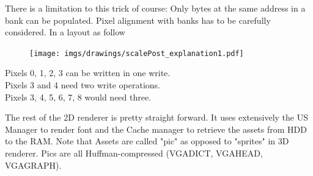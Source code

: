 \par



There is a limitation to this trick of course: Only bytes at the same address in a bank can be populated. Pixel alignment with banks has to be carefully considered. In a layout as follow\\
\par
\begin{figure}[H]
\centering
 \texttt{[image: imgs/drawings/scalePost\_explanation1.pdf]}
 \end{figure}
Pixels 0, 1, 2, 3 can be written in one write.\\
Pixels 3 and 4 need two write operations.\\
Pixels 3, 4, 5, 6, 7, 8 would need three.\\


\par
The rest of the 2D renderer is pretty straight forward. It uses extensively the US Manager to render font and the Cache manager to retrieve the assets from HDD to the RAM. Note that Assets are called "pic" as opposed to "sprites" in 3D renderer. Pics are all Huffman-compressed (VGADICT, VGAHEAD, VGAGRAPH).
\par
{}